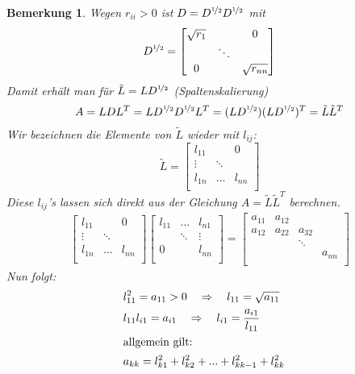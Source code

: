 \documentclass[12pt]{article}
\theoremstyle{break}
\newtheorem*{comment*}{Bemerkung}
\begin{document}
\begin{comment*}
Wegen $r_{ii} > 0$ ist $D = D^{\nicefrac{1}{2}}D^{\nicefrac{1}{2}}$ mit 
$$D^{\nicefrac{1}{2}} =
  \begin{bmatrix}
  \sqrt{r_1} && 0 \\
  & \ddots \\
  0 && \sqrt{r_{nn}} \\
  \end{bmatrix}
$$
Damit erhält man für $\tilde{L} = LD^{\nicefrac{1}{2}}$ (Spaltenskalierung)
$$A = LDL^T = LD^{\nicefrac{1}{2}}D^{\nicefrac{1}{2}}L^T = (LD^{\nicefrac{1}{2}})(LD^{\nicefrac{1}{2}})^T = \tilde{L}\tilde{L}^T$$
Wir bezeichnen die Elemente von $\tilde{L}$ wieder mit $l_{ij}$:
$$\tilde{L} =
  \begin{bmatrix}
  l_{11} && 0 \\
  \vdots& \ddots \\
  l_{1n} &\dots& l_{nn} \\
  \end{bmatrix}
$$
Diese $l_{ij}$'s lassen sich direkt aus der Gleichung $A = \tilde{L}\tilde{L}^T$ berechnen.
\begin{align*}
\begin{bmatrix}
  l_{11} && 0 \\
  \vdots& \ddots \\
  l_{1n} &\dots& l_{nn} \\
\end{bmatrix}
\begin{bmatrix}
  l_{11} &\dots& l_{n1} \\
  & \ddots &\vdots\\
  0 && l_{nn}\\
\end{bmatrix}
=
\begin{bmatrix}
  a_{11}&a_{12} \\
  a_{12}&a_{22}&a_{32} \\
  &&\ddots \\
  &&&a_{nn} \\
\end{bmatrix}
\end{align*}
Nun folgt:
\begin{align*}
&l_{11}^2 = a_{11} > 0 \quad \Rightarrow \quad l_{11} = \sqrt{a_{11}} &\\
&l_{11}l_{i1} = a_{i1} \quad \Rightarrow \quad l_{i1} = \frac{a_{i1}}{l_{11}} &\\
\intertext{allgemein gilt:}
&a_{kk} = l_{k1}^2 + l_{k2}^2 + ... + l_{kk-1}^2 + l_{kk}^2 &\\

\end{align*}
\end{comment*}
\end{document}
